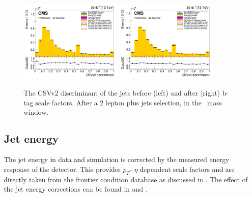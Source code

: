 \begin{figure}[htbp]
	\centering
	\includegraphics[width=0.45\textwidth]{5_Eventselection/Figures/Reweighing/bdis/2lepcontrol_afterAtLeast1Jet_afterZWindow_bdisc_all_Stack_before}
	\includegraphics[width=0.45\textwidth]{5_Eventselection/Figures/Reweighing/bdis/2lepcontrol_afterAtLeast1Jet_afterZWindow_bdisc_all_Stack_after}	
	\caption{The CSVv2 discriminant of the jets before (left) and after (right) b-tag scale factors. After a 2 lepton plus jets selection, in the \PZ\ mass window.}
	\label{fig:bSF}
\end{figure}

\subsection*{Jet energy}
\label{sec:jer}
The jet energy in data and simulation is corrected by the measured energy response of the detector. This provides $p_T$- $\eta$ dependent scale factors and are directly taken from the frontier condition database as discussed in . 
The effect of the jet energy corrections can be found in  and . 

